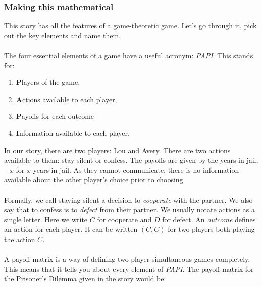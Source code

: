 \subsubsection{Making this mathematical}
This story has all the features of a game-theoretic game. Let's go through it, pick out the key elements and name them.\\
\\
The four essential elements of a game have a useful acronym: \textit{PAPI}\cite{rasmusen_2010}. This stands for:
\begin{enumerate}[nosep]
\item \textbf{P}layers of the game,
\item \textbf{A}ctions available to each player,
\item \textbf{P}ayoffs for each outcome
\item \textbf{I}nformation available to each player.
\end{enumerate}
\par\null\par
In our story, there are two players: Lou and Avery. There are two actions available to them: stay silent or confess.  The payoffs are given by the years in jail, $-x$ for $x$ years in jail. As they cannot communicate, there is no information available about the other player's choice prior to choosing.\\
\\
Formally, we call staying silent a decision to \textit{cooperate} with the partner. We also say that to confess is to \textit{defect} from their partner. We usually notate actions as a single letter. Here we write $C$ for cooperate and $D$ for defect. An \textit{outcome} defines an action for each player. It can be written $(C,C)$ for two players both playing the action $C$.\\
\\
A payoff matrix is a way of defining two-player simultaneous games completely\cite{osborne}. This means that it tells you about every element of \textit{PAPI}. The payoff matrix for the Prisoner's Dilemma given in the story would be:\\
